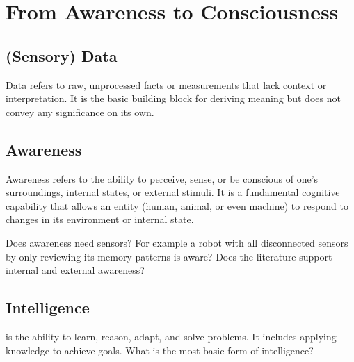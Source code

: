 \chapter{From Awareness to Consciousness}
\section{(Sensory) Data} Data refers to raw, unprocessed facts or measurements that lack context or interpretation. It is the basic building block for deriving meaning but does not convey any significance on its own.

\section{Awareness}
Awareness refers to the ability to perceive, sense, or be conscious of one’s surroundings, internal states, or external stimuli. It is a fundamental cognitive capability that allows an entity (human, animal, or even machine) to respond to changes in its environment or internal state.

Does awareness need sensors? For example a robot with all disconnected sensors by only reviewing its memory patterns is aware? Does the literature support internal and external awareness?




\section{Intelligence}  is the ability to learn, reason, adapt, and solve problems. It includes applying knowledge to achieve goals. What is the most basic form of intelligence?



